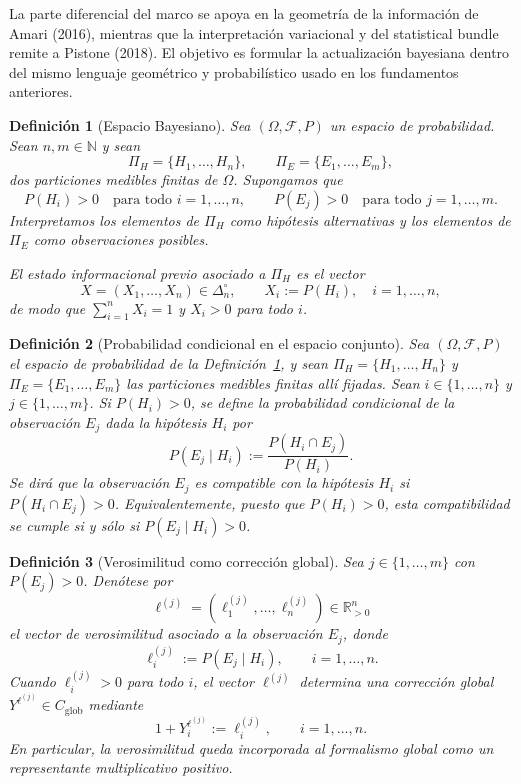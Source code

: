 \documentclass[12pt]{article}
\newtheorem{definicion}{Definición}[section]
\begin{document}
La parte diferencial del marco se apoya en la geometría de la información de Amari (2016), mientras que la interpretación variacional y del statistical bundle remite a Pistone (2018). El objetivo es formular la actualización bayesiana dentro del mismo lenguaje geométrico y probabilístico usado en los fundamentos anteriores.



\begin{definicion}[Espacio Bayesiano]\label{def:espacio_conjunto}
Sea $(\Omega,\mathcal F,P)$ un espacio de probabilidad. Sean $n,m\in\mathbb N$ y sean
\[
\Pi_H=\{H_1,\dots,H_n\},\qquad \Pi_E=\{E_1,\dots,E_m\},
\]
dos particiones medibles finitas de $\Omega$. Supongamos que
\[
P(H_i)>0\quad \text{para todo } i=1,\dots,n,
\qquad
P(E_j)>0\quad \text{para todo } j=1,\dots,m.
\]
Interpretamos los elementos de $\Pi_H$ como hipótesis alternativas y los elementos de $\Pi_E$ como observaciones posibles.

El estado informacional previo asociado a $\Pi_H$ es el vector
\[
X=(X_1,\dots,X_n)\in\Delta_n^\circ,
\qquad
X_i:=P(H_i),\quad i=1,\dots,n,
\]
de modo que $\sum_{i=1}^n X_i=1$ y $X_i>0$ para todo $i$.
\end{definicion}

\begin{definicion}[Probabilidad condicional en el espacio conjunto]\label{def:prob_condicional}
Sea $(\Omega,\mathcal F,P)$ el espacio de probabilidad de la Definición~\ref{def:espacio_conjunto}, y sean $\Pi_H=\{H_1,\dots,H_n\}$ y $\Pi_E=\{E_1,\dots,E_m\}$ las particiones medibles finitas allí fijadas. Sean $i\in\{1,\dots,n\}$ y $j\in\{1,\dots,m\}$. Si $P(H_i)>0$, se define la probabilidad condicional de la observación $E_j$ dada la hipótesis $H_i$ por
\[
P(E_j\mid H_i):=\frac{P(H_i\cap E_j)}{P(H_i)}.
\]
Se dirá que la observación $E_j$ es compatible con la hipótesis $H_i$ si $P(H_i\cap E_j)>0$. Equivalentemente, puesto que $P(H_i)>0$, esta compatibilidad se cumple si y sólo si $P(E_j\mid H_i)>0$.
\end{definicion}

\begin{definicion}[Verosimilitud como corrección global]\label{def:verosimilitud}
Sea $j\in\{1,\dots,m\}$ con $P(E_j)>0$. Denótese por
\[
\ell^{(j)}=(\ell_1^{(j)},\dots,\ell_n^{(j)})\in\mathbb R_{>0}^n
\]
el vector de verosimilitud asociado a la observación $E_j$, donde
\[
\ell_i^{(j)}:=P(E_j\mid H_i),\qquad i=1,\dots,n.
\]
Cuando $\ell_i^{(j)}>0$ para todo $i$, el vector $\ell^{(j)}$ determina una corrección global $Y^{\ell^{(j)}}\in C_{\mathrm{glob}}$ mediante
\[
1+Y_i^{\ell^{(j)}}:=\ell_i^{(j)},\qquad i=1,\dots,n.
\]
En particular, la verosimilitud queda incorporada al formalismo global como un representante multiplicativo positivo.
\end{definicion}
\end{document}
